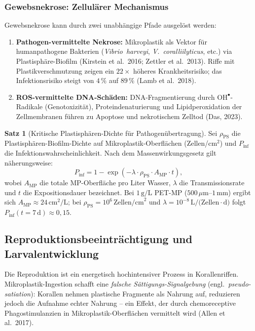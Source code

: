 ﻿\documentclass[12pt,a4paper]{article}
\theoremstyle{definition}
\newtheorem{satz}{Satz}
\theoremstyle{remark}
\newcommand{\MP}{Mikroplastik}
\begin{document}
\subsubsection{Gewebsnekrose: Zellul\"arer Mechanismus}

Gewebsnekrose kann durch zwei unabh\"angige Pfade ausgel\"ost werden:
\begin{enumerate}[leftmargin=*]
  \item \textbf{Pathogen-vermittelte Nekrose:} \MP{} als Vektor f\"ur
    humanpathogene Bakterien (\textit{Vibrio~harveyi}, \textit{V.~coralliilyticus},
    etc.) via Plastisph\"are-Biofilm (Kirstein et al.\ 2016; Zettler et al.\ 2013).
    Riffe mit Plastikverschmutzung zeigen ein $22\times$ h\"oheres Krankheitsrisiko;
    das Infektionsrisiko steigt von $4\,\%$ auf $89\,\%$ (Lamb et al.\ 2018).
  \item \textbf{ROS-vermittelte DNA-Sch\"aden:} DNA-Fragmentierung durch
    $\text{OH}^\bullet$-Radikale (Genotoxizit\"at), Proteindenaturierung und
    Lipidperoxidation der Zellmembranen f\"uhren zu Apoptose und nekrotischem
    Zelltod (Das, 2023).
\end{enumerate}

\begin{satz}[Kritische Plastisph\"aren-Dichte f\"ur Pathogenübertragung]
Sei $\rho_{\text{PS}}$ die Plastisph\"aren-Biofilm-Dichte auf \MP{}-Oberflächen
(Zellen/cm$^2$) und $P_{\text{inf}}$ die Infektionswahrscheinlichkeit. Nach
dem Massenwirkungsgesetz gilt n\"aherungsweise:
\begin{equation}
  P_{\text{inf}} = 1 - \exp\left(-\lambda \cdot \rho_{\text{PS}} \cdot A_{\text{MP}} \cdot t\right),
  \label{eq:pathogen_prob}
\end{equation}
wobei $A_{\text{MP}}$ die totale MP-Oberfläche pro Liter Wasser,
$\lambda$ die Transmissionsrate und $t$ die Expositionsdauer bezeichnet.
Bei $1\,\text{g/L}$ PET-MP ($500\,\mu$m--$1\,\text{mm}$) ergibt sich
$A_{\text{MP}} \approx 24\,\text{cm}^2/\text{L}$;
bei $\rho_{\text{PS}} = 10^6\,\text{Zellen/cm}^2$ und
$\lambda = 10^{-8}\,\text{L/(Zellen}\cdot\text{d})$ folgt
$P_{\text{inf}}(t=7\,\text{d}) \approx 0{,}15$.
\end{satz}

\subsection{Reproduktionsbeeinträchtigung und Larvalentwicklung}
\label{subsec:reproduktion}

Die Reproduktion ist ein energetisch hochintensiver Prozess in Korallenriffen.
\MP{}-Ingestion schafft eine \textit{falsche Sättigungs-Signalgebung} (engl.\
\textit{pseudo-satiation}): Korallen nehmen plastische Fragmente als Nahrung auf,
reduzieren jedoch die Aufnahme echter Nahrung -- ein Effekt, der durch
chemoreceptive Phagostimulanzien in \MP{}-Oberflächen vermittelt wird
(Allen et al.\ 2017).
\end{document}
